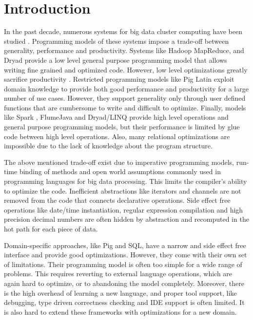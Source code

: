 \section{Introduction}
\label{sec:introduction}

In the past decade, numerous systems for big data cluster computing have been
studied \cite{dean_mapreduce:_2008, yu_dryadlinq:_2008-1, olston_pig_2008-1,
thusoo_hive_2010-1, spark-nsdi}. Programming models of these systems impose a
trade-off between generality, performance and productivity. Systems like Hadoop
MapReduce, \cite{hadoop} and Dryad \cite{isard_dryad:_2007} provide a low level
general purpose programming model that allows writing fine grained and optimized
code. However, low level optimizations greatly sacrifice productivity
\cite{chambers_flumejava:_2010}. Restricted programming models like Pig Latin
\cite{olston_pig_2008-1} exploit domain knowledge to provide both good
performance and productivity for a large number of use cases. However, they
support generality only through user defined functions that are cumbersome to
write and difficult to optimize. Finally, models like Spark \cite{spark-nsdi},
FlumeJava \cite{chambers_flumejava:_2010} and Dryad/LINQ
\cite{yu_dryadlinq:_2008-1} provide high level operations and general purpose
programming models, but their performance is limited by glue code between high
level operations. Also, many relational optimizations are impossible due to the
lack of knowledge about the program structure.

The above mentioned trade-off exist due to imperative programming models,
run-time binding of methods and open world assumptions commonly used in
programming languages for big data processing. This limits the compiler's
ability to optimize the code. Inefficient abstractions like iterators and channels are
not removed from the code that connects declarative operations. Side effect free
operations like date/time instantiation, regular expression compilation and high
precision decimal numbers are often hidden by abstraction and recomputed in the
hot path for each piece of data.

Domain-specific approaches, like Pig and SQL, have a narrow and side effect
free interface and provide good optimizations. However, they come with their own set
of limitations. Their programming model is often too simple for a wide range of
problems. This requires reverting to external language operations, which are
again hard to optimize, or to abandoning the model completely. Moreover, there
is the high overhead of learning a new language, and proper tool support, like
debugging, type driven correctness checking and IDE support is often limited. It
is also hard to extend these frameworks with optimizations for a new domain.

